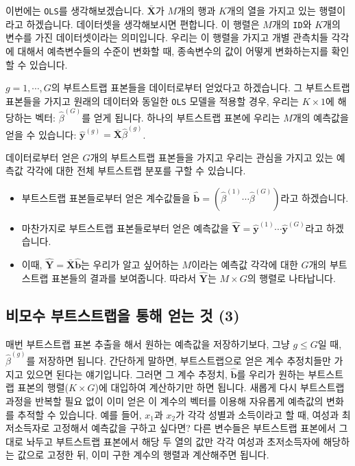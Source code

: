 \documentclass[
]{book}
\begin{document}
이번에는 \texttt{OLS}를 생각해보겠습니다. \(\bar{\textbf{X}}\)가 \(M\)개의 행과 \(K\)개의 열을 가지고 있는 행렬이라고 하겠습니다. 데이터셋을 생각해보시면 편합니다. 이 행렬은 \(M\)개의 \texttt{ID}와 \(K\)개의 변수를 가진 데이터셋이라는 의미입니다. 우리는 이 행렬을 가지고 개별 관측치들 각각에 대해서 예측변수들의 수준이 변화할 때, 종속변수의 값이 어떻게 변화하는지를 확인할 수 있습니다.

\(g = 1, \cdots, G\)의 부트스트랩 표본들을 데이터로부터 얻었다고 하겠습니다. 그 부트스트랩 표본들을 가지고 원래의 데이터와 동일한 \texttt{OLS} 모델을 적용할 경우, 우리는 \(K\times 1\)에 해당하는 벡터: \(\hat{\beta}^{(G)}\)를 얻게 됩니다. 하나의 부트스트랩 표본에 우리는 \(M\)개의 예측값을 얻을 수 있습니다: \(\hat{\textbf{y}}^{(g)} = \bar{\textbf{X}}\hat{\beta}^{(g)}\).

데이터로부터 얻은 \(G\)개의 부트스트랩 표본들을 가지고 우리는 관심을 가지고 있는 예측값 각각에 대한 전체 부트스트랩 분포를 구할 수 있습니다.

\begin{itemize}
\item
  부트스트랩 표본들로부터 얻은 계수값들을 \(\hat{\textbf{b}} = (\hat{\beta}^{(1)} \cdots\hat{\beta}^{(G)})\)라고 하겠습니다.
\item
  마찬가지로 부트스트랩 표본들로부터 얻은 예측값을 \(\hat{\textbf{Y}} = \hat{\textbf{y}}^{(1)}\cdots\hat{\textbf{y}}^{(G)}\)라고 하겠습니다.
\item
  이때, \(\hat{\textbf{Y}} = \bar{\textbf{X}}\hat{\textbf{b}}\)는 우리가 알고 싶어하는 \(M\)이라는 예측값 각각에 대한 \(G\)개의 부트스트랩 표본들의 결과를 보여줍니다. 따라서 \(\hat{\textbf{Y}}\)는 \(M\times G\)의 행렬로 나타납니다.
\end{itemize}

\hypertarget{uxbe44uxbaa8uxc218-uxbd80uxd2b8uxc2a4uxd2b8uxb7a9uxc744-uxd1b5uxd574-uxc5bbuxb294-uxac83-3}{%
\subsection{비모수 부트스트랩을 통해 얻는 것 (3)}\label{uxbe44uxbaa8uxc218-uxbd80uxd2b8uxc2a4uxd2b8uxb7a9uxc744-uxd1b5uxd574-uxc5bbuxb294-uxac83-3}}

매번 부트스트랩 표본 추출을 해서 원하는 예측값을 저장하기보다, 그냥 \(g \leq G\)일 때, \(\hat{\beta}^{(g)}\)를 저장하면 됩니다. 간단하게 말하면, 부트스트랩으로 얻은 계수 추정치들만 가지고 있으면 된다는 얘기입니다. 그러면 그 계수 추정치, \(\hat{\textbf{b}}\)를 우리가 원하는 부트스트랩 표본의 행렬(\(K\times G\))에 대입하여 계산하기만 하면 됩니다. 새롭게 다시 부트스트랩 과정을 반복할 필요 없이 이미 얻은 이 계수의 벡터를 이용해 자유롭게 예측값의 변화를 추적할 수 있습니다. 예를 들어, \(x_1\)과 \(x_2\)가 각각 성별과 소득이라고 할 때, 여성과 최저소득자로 고정해서 예측값을 구하고 싶다면? 다른 변수들은 부트스트랩 표본에서 그대로 놔두고 부트스트랩 표본에서 해당 두 열의 값만 각각 여성과 초저소득자에 해당하는 값으로 고정한 뒤, 이미 구한 계수의 행렬과 계산해주면 됩니다.
\end{document}
